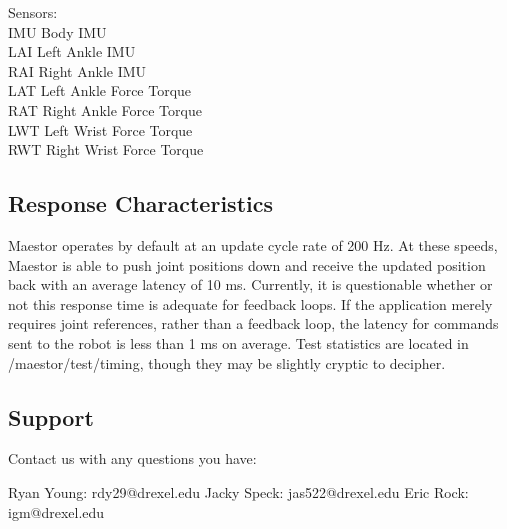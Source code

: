 \documentclass[12pt]{article}
\begin{document}
\noindent Sensors:\\

\noindent IMU		Body IMU\\
LAI		Left Ankle IMU\\
RAI		Right Ankle IMU\\

\noindent LAT		Left Ankle Force Torque\\
RAT		Right Ankle Force Torque\\
LWT		Left Wrist Force Torque\\
RWT		Right Wrist Force Torque\\

\subsection{Response Characteristics}

Maestor operates by default at an update cycle rate of 200 Hz. At these speeds, Maestor is able to push joint positions down and receive the updated position back with an average latency of 10 ms. Currently, it is questionable whether or not this response time is adequate for feedback loops. If the application merely requires joint references, rather than a feedback loop, the latency for commands sent to the  robot is less than 1 ms on average. Test statistics are located in /maestor/test/timing, though they may be slightly cryptic to decipher.

\subsection{Support}

Contact us with any questions you have:

Ryan Young: rdy29@drexel.edu
Jacky Speck: jas522@drexel.edu
Eric Rock: igm@drexel.edu
\end{document}

